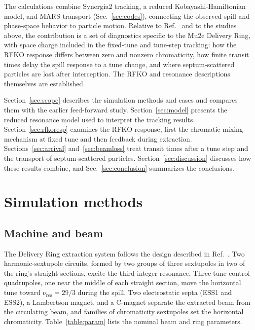 \documentclass[a4paper,fleqn]{cas-sc}
\begin{document}
The calculations combine Synergia2 tracking, a reduced Kobayashi-Hamiltonian model, and MARS transport (Sec.~\ref{sec:codes}), connecting the observed spill and phase-space behavior to particle motion. Relative to Ref.~\cite{mu2e} and to the studies above, the contribution is a set of diagnostics specific to the Mu2e Delivery Ring, with space charge included in the fixed-tune and tune-step tracking: how the RFKO response differs between zero and nonzero chromaticity, how finite transit times delay the spill response to a tune change, and where septum-scattered particles are lost after interception. The RFKO and resonance descriptions themselves are established.

Section~\ref{sec:scope} describes the simulation methods and cases and compares them with the earlier feed-forward study. Section~\ref{sec:model} presents the reduced resonance model used to interpret the tracking results. Section~\ref{sec:rfkoresp} examines the RFKO response, first the chromatic-mixing mechanism at fixed tune and then feedback during extraction. Sections~\ref{sec:arrival} and~\ref{sec:beamloss} treat transit times after a tune step and the transport of septum-scattered particles. Section~\ref{sec:discussion} discusses how these results combine, and Sec.~\ref{sec:conclusion} summarizes the conclusions.


\section{\label{sec:scope}Simulation methods}

\subsection{\label{sec:baseline}Machine and beam}

The Delivery Ring extraction system follows the design described in Ref.~\cite{mu2e}. Two harmonic-sextupole circuits, formed by two groups of three sextupoles in two of the ring's straight sections, excite the third-integer resonance. Three tune-control quadrupoles, one near the middle of each straight section, move the horizontal tune toward $\nu_{\mathrm{res}}=29/3$ during the spill. Two electrostatic septa (ESS1 and ESS2), a Lambertson magnet, and a C-magnet separate the extracted beam from the circulating beam, and families of chromaticity sextupoles set the horizontal chromaticity. Table~\ref{table:param} lists the nominal beam and ring parameters.
\end{document}
